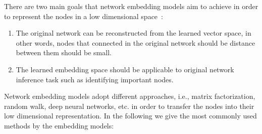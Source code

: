 There are two main goals that network embedding models aim to achieve in order to represent the nodes in a low dimensional space~\cite{DBLP:journals/tkde/CuiWPZ19}:\\
\begin{enumerate}
  \item The original network can be reconstructed from the learned vector space, in other words, nodes that connected in the original network should be distance between them should be small.\\
  \item The learned embedding space should be applicable to original network inference task such as identifying important nodes.\\
\end{enumerate}

Network embedding models adopt different approaches, i.e., matrix factorization, random walk, deep neural networks, etc. in order to 
transfer the nodes into their low dimensional representation. In the following we give the most commonly used methods by the embedding models:\\
